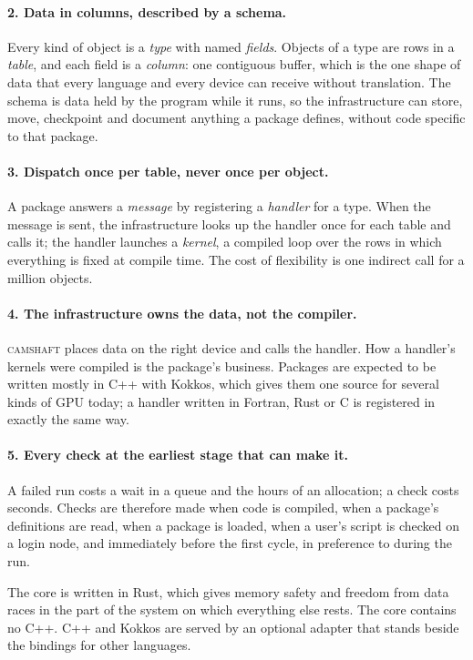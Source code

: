 \documentclass[11pt,a4paper]{article}
\newcommand{\camshaft}{\textsc{camshaft}}
\begin{document}
\paragraph{2. Data in columns, described by a schema.}
Every kind of object is a \emph{type} with named \emph{fields}.  Objects of
a type are rows in a \emph{table}, and each field is a \emph{column}: one
contiguous buffer, which is the one shape of data that every language and
every device can receive without translation.  The schema is data held by
the program while it runs, so the infrastructure can store, move,
checkpoint and document anything a package defines, without code specific
to that package.

\paragraph{3. Dispatch once per table, never once per object.}
A package answers a \emph{message} by registering a \emph{handler} for a
type.  When the message is sent, the infrastructure looks up the handler
once for each table and calls it; the handler launches a \emph{kernel}, a
compiled loop over the rows in which everything is fixed at compile time.
The cost of flexibility is one indirect call for a million objects.

\paragraph{4. The infrastructure owns the data, not the compiler.}
\camshaft{} places data on the right device and calls the handler.  How a
handler's kernels were compiled is the package's business.  Packages are
expected to be written mostly in C++ with Kokkos, which gives them one
source for several kinds of GPU today; a handler written in Fortran, Rust
or C is registered in exactly the same way.

\paragraph{5. Every check at the earliest stage that can make it.}
A failed run costs a wait in a queue and the hours of an allocation; a
check costs seconds.  Checks are therefore made when code is compiled, when
a package's definitions are read, when a package is loaded, when a user's
script is checked on a login node, and immediately before the first cycle,
in preference to during the run.

\medskip
The core is written in Rust, which gives memory safety and freedom from
data races in the part of the system on which everything else rests.  The
core contains no C++.  C++ and Kokkos are served by an optional adapter
that stands beside the bindings for other languages.
\end{document}
